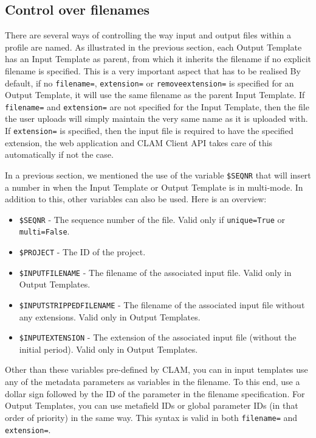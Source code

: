 \documentclass[a4paper,12pt]{report}
\begin{document}
\subsection{Control over filenames}
\label{sec:filenamevariables}

There are several ways of controlling the way input and output files within a profile are named. As illustrated in the previous section, each Output Template has an Input Template as parent, from which it inherits the filename if no explicit filename is specified. This is a very important aspect that has to be realised By default, if no \texttt{filename=}, \texttt{extension=} or \texttt{removeextension=} is specified for an Output Template, it will use the same filename as the parent Input Template. If \texttt{filename=} and \texttt{extension=} are not specified for the Input Template, then the file the user uploads will simply maintain the very same name as it is uploaded with. If \texttt{extension=} is specified, then the input file is required to have the specified extension, the web application and CLAM Client API takes care of this automatically if not the case.

In a previous section, we mentioned the use of the variable \texttt{\$SEQNR} that will insert a number in when the Input Template or Output Template is in multi-mode. In addition to this, other variables can also be used. Here is an overview:

\begin{itemize}
\item \texttt{\$SEQNR} - The sequence number of the file. Valid only if \texttt{unique=True} or \texttt{multi=False}.
\item \texttt{\$PROJECT} - The ID of the project.
\item \texttt{\$INPUTFILENAME} - The filename of the associated input file. Valid only in Output Templates.
\item \texttt{\$INPUTSTRIPPEDFILENAME} - The filename of the associated input file without any extensions. Valid only in Output Templates.
\item \texttt{\$INPUTEXTENSION} - The extension of the associated input file (without the initial period). Valid only in Output Templates.
\end{itemize} 

Other than these variables pre-defined by CLAM, you can in input templates use any of the metadata parameters as variables in the filename. To this end, use a dollar sign followed by the ID of the parameter in the filename specification. For Output Templates, you can use metafield IDs or global parameter IDs (in that order of priority) in the same way. This syntax is valid in both \texttt{filename=} and \texttt{extension=}.
\end{document}
